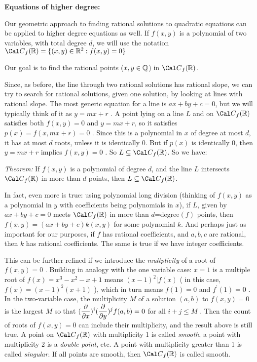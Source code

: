 
\ssk


\msk

{\bf Equations of higher degree:}

\msk

Our geometric approach to finding rational solutions to 
quadratic equations can be applied to higher degree equations
as well. If $f(x,y)$ is a polynomial of two variables, 
with total degree $d$, we will use the notation
\hhsk
${\Cal C}_f({\Bbb R}) = \{(x,y)\in{\Bbb R}^2 : f(x,y)=0\}$ 

\ssk

Our goal is to find the rational points ($x,y\in{\Bbb Q}$) in 
${\Cal C}_f({\Bbb R})$.

\msk

Since, as before, the line through two rational solutions has rational 
slope, we can try to search for rational solutions, given one 
solution, by looking at lines with rational slope. The most generic
equation for a line is $ax+by+c=0$, but we will typically think of it as
$y=mx+r$ . A point lying on a line $L$ and on ${\Cal C}_f({\Bbb R})$
satisfies both $f(x,y)=0$ and $y=mx+r$, so it satisfies $p(x)=f(x,mx+r)=0$ .
Since this is a polynomial in $x$ of degree at most $d$, it has 
at most $d$ roots, unless it is identically 0. But if $p(x)$ is identically 0,
then $y=mx+r$ implies $f(x,y)=0$ . So $L\subseteq {\Cal C}_f({\Bbb R})$.
So we have:

\ssk

{\it Theorem:} If $f(x,y)$ is a polynomial of degree $d$, and the line $L$
intersects ${\Cal C}_f({\Bbb R})$ in more than $d$ points, then 
$L\subseteq {\Cal C}_f({\Bbb R})$.

\ssk

In fact, even more is true: using polynomial long division (thinking
of $f(x,y)$ as a polynomial in $y$ with coefficients being polynomials 
in $x$), if $L$, given by $ax+by+c=0$ meets ${\Cal C}_f({\Bbb R})$
in more than $d$=degree$(f)$ points, then $f(x,y)=(ax+by+c)k(x,y)$
for some polynomial $k$. And perhaps just as important for our
purposes, if $f$ has rational coefficients, and $a,b,c$ are rational,
then $k$ has rational coefficients. The same is true if we have
integer coefficients.

\msk

This can be further refined if we introduce the {\it multplicity} of
a root of $f(x,y)=0$ . Building in analogy with the one variable case:
$x=1$ is a multiple root of $f(x)=x^3-x^2-x+1$ means $(x-1)^2|f(x)$
( in this case, $f(x)=(x-1)^2(x+1)$ ), which in turn means $f(1)=0$ 
and $f^\prime(1)=0$ .
In the two-variable case, the multiplicity $M$ of a solution $(a,b)$
to $f(x,y)=0$ is the largest $M$ so that
$\displaystyle ({{\partial}\over{\partial x}})^i({{\partial}\over{\partial y}})^jf(a,b)=0$ for all $i+j\leq M$ . Then the count 
of roots of $f(x,y)=0$ can include their multiplicity, and the result above
is still true. A point on ${\Cal C}_f({\Bbb R})$ with multiplicity 1 is
called {\it smooth}, a point with multiplicity 2 is a {\it double point},
etc. A point with multiplicity greater than 1 is called {\it singular}.
If all points are smooth, then ${\Cal C}_f({\Bbb R})$ is called
smooth.

